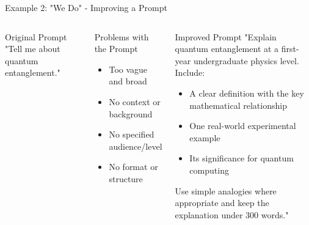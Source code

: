 \documentclass{beamer}
\begin{document}
\begin{frame}{Example 2: "We Do" - Improving a Prompt}
\begin{columns}
\begin{block}{Original Prompt}
"Tell me about quantum entanglement."
\end{block}
\pause 
\begin{alertblock}{Problems with the Prompt}
\begin{itemize}
  \item Too vague and broad
  \item No context or background
  \item No specified audience/level
  \item No format or structure
\end{itemize}
\end{alertblock}
\pause 
{}
\begin{block}{Improved Prompt}
"Explain quantum entanglement at a first-year undergraduate physics level. Include:
\begin{itemize}
  \item A clear definition with the key mathematical relationship
  \item One real-world experimental example
  \item Its significance for quantum computing
\end{itemize}
Use simple analogies where appropriate and keep the explanation under 300 words."
\end{block}
\end{columns}
\end{frame}
\end{document}
